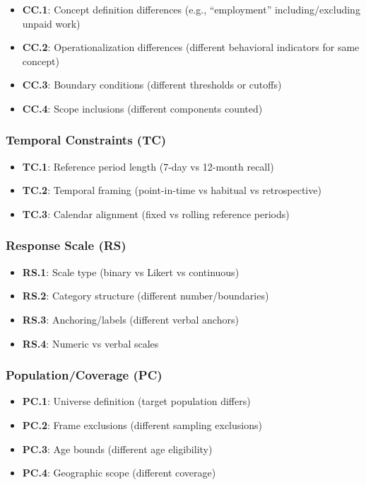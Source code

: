 \documentclass[
  letterpaper,
]{report}
\providecommand{\tightlist}{%
  \setlength{\itemsep}{0pt}\setlength{\parskip}{0pt}}
\begin{document}
\begin{itemize}
\tightlist
\item
  \textbf{CC.1}: Concept definition differences (e.g., ``employment''
  including/excluding unpaid work)
\item
  \textbf{CC.2}: Operationalization differences (different behavioral
  indicators for same concept)
\item
  \textbf{CC.3}: Boundary conditions (different thresholds or cutoffs)
\item
  \textbf{CC.4}: Scope inclusions (different components counted)
\end{itemize}

\subsubsection{Temporal Constraints (TC)}\label{temporal-constraints-tc}

\begin{itemize}
\tightlist
\item
  \textbf{TC.1}: Reference period length (7-day vs 12-month recall)
\item
  \textbf{TC.2}: Temporal framing (point-in-time vs habitual vs
  retrospective)
\item
  \textbf{TC.3}: Calendar alignment (fixed vs rolling reference periods)
\end{itemize}

\subsubsection{Response Scale (RS)}\label{response-scale-rs}

\begin{itemize}
\tightlist
\item
  \textbf{RS.1}: Scale type (binary vs Likert vs continuous)
\item
  \textbf{RS.2}: Category structure (different number/boundaries)
\item
  \textbf{RS.3}: Anchoring/labels (different verbal anchors)
\item
  \textbf{RS.4}: Numeric vs verbal scales
\end{itemize}

\subsubsection{Population/Coverage (PC)}\label{populationcoverage-pc}

\begin{itemize}
\tightlist
\item
  \textbf{PC.1}: Universe definition (target population differs)
\item
  \textbf{PC.2}: Frame exclusions (different sampling exclusions)
\item
  \textbf{PC.3}: Age bounds (different age eligibility)
\item
  \textbf{PC.4}: Geographic scope (different coverage)
\end{itemize}
\end{document}

